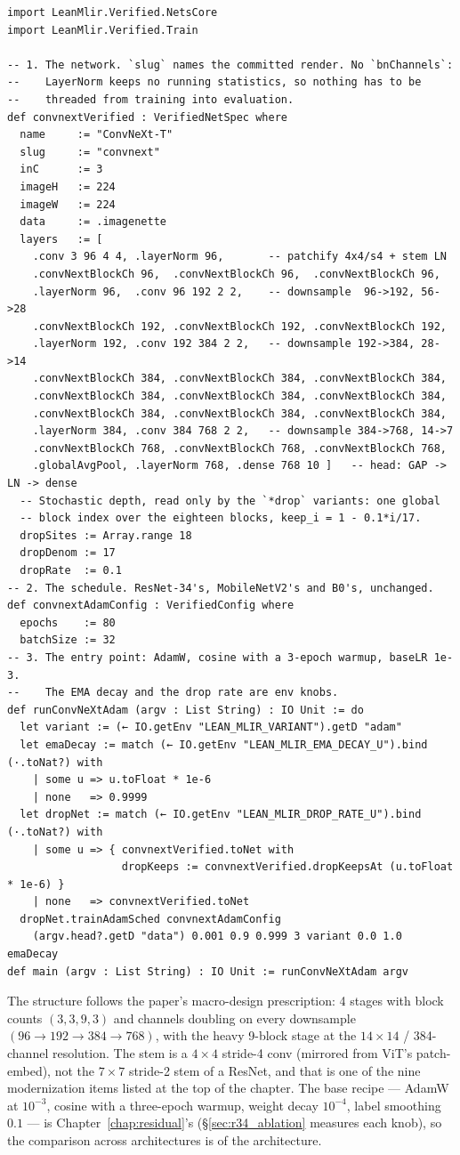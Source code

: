 \begin{verbatim}
import LeanMlir.Verified.NetsCore
import LeanMlir.Verified.Train

-- 1. The network. `slug` names the committed render. No `bnChannels`:
--    LayerNorm keeps no running statistics, so nothing has to be
--    threaded from training into evaluation.
def convnextVerified : VerifiedNetSpec where
  name     := "ConvNeXt-T"
  slug     := "convnext"
  inC      := 3
  imageH   := 224
  imageW   := 224
  data     := .imagenette
  layers   := [
    .conv 3 96 4 4, .layerNorm 96,       -- patchify 4x4/s4 + stem LN
    .convNextBlockCh 96,  .convNextBlockCh 96,  .convNextBlockCh 96,
    .layerNorm 96,  .conv 96 192 2 2,    -- downsample  96->192, 56->28
    .convNextBlockCh 192, .convNextBlockCh 192, .convNextBlockCh 192,
    .layerNorm 192, .conv 192 384 2 2,   -- downsample 192->384, 28->14
    .convNextBlockCh 384, .convNextBlockCh 384, .convNextBlockCh 384,
    .convNextBlockCh 384, .convNextBlockCh 384, .convNextBlockCh 384,
    .convNextBlockCh 384, .convNextBlockCh 384, .convNextBlockCh 384,
    .layerNorm 384, .conv 384 768 2 2,   -- downsample 384->768, 14->7
    .convNextBlockCh 768, .convNextBlockCh 768, .convNextBlockCh 768,
    .globalAvgPool, .layerNorm 768, .dense 768 10 ]   -- head: GAP -> LN -> dense
  -- Stochastic depth, read only by the `*drop` variants: one global
  -- block index over the eighteen blocks, keep_i = 1 - 0.1*i/17.
  dropSites := Array.range 18
  dropDenom := 17
  dropRate  := 0.1
-- 2. The schedule. ResNet-34's, MobileNetV2's and B0's, unchanged.
def convnextAdamConfig : VerifiedConfig where
  epochs    := 80
  batchSize := 32
-- 3. The entry point: AdamW, cosine with a 3-epoch warmup, baseLR 1e-3.
--    The EMA decay and the drop rate are env knobs.
def runConvNeXtAdam (argv : List String) : IO Unit := do
  let variant := (← IO.getEnv "LEAN_MLIR_VARIANT").getD "adam"
  let emaDecay := match (← IO.getEnv "LEAN_MLIR_EMA_DECAY_U").bind (·.toNat?) with
    | some u => u.toFloat * 1e-6
    | none   => 0.9999
  let dropNet := match (← IO.getEnv "LEAN_MLIR_DROP_RATE_U").bind (·.toNat?) with
    | some u => { convnextVerified.toNet with
                  dropKeeps := convnextVerified.dropKeepsAt (u.toFloat * 1e-6) }
    | none   => convnextVerified.toNet
  dropNet.trainAdamSched convnextAdamConfig
    (argv.head?.getD "data") 0.001 0.9 0.999 3 variant 0.0 1.0 emaDecay
def main (argv : List String) : IO Unit := runConvNeXtAdam argv
\end{verbatim}

\noindent The structure follows the paper's macro-design prescription:
4 stages with block counts $(3, 3, 9, 3)$ and channels doubling on
every downsample $(96 \to 192 \to 384 \to 768)$, with the heavy
9-block stage at the $14 \times 14$ / 384-channel resolution. The stem
is a $4 \times 4$ stride-4 conv (mirrored from ViT's patch-embed), not
the $7 \times 7$ stride-2 stem of a ResNet, and that is one of the nine
modernization items listed at the top of the chapter. The base recipe --- AdamW at $10^{-3}$, cosine with a three-epoch warmup,
weight decay $10^{-4}$, label smoothing $0.1$ --- is Chapter~\ref{chap:residual}'s
(\S\ref{sec:r34_ablation} measures each knob), so the comparison across
architectures is of the architecture.

